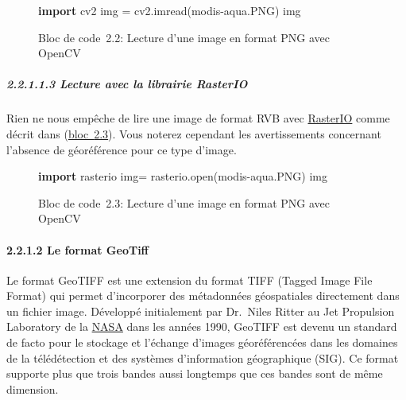 \documentclass[
]{article}
\newenvironment{Shaded}{}{}
\newcommand{\BuiltInTok}[1]{\textcolor[rgb]{0.00,0.50,0.00}{#1}}
\newcommand{\ImportTok}[1]{\textcolor[rgb]{0.00,0.50,0.00}{\textbf{#1}}}
\newcommand{\NormalTok}[1]{#1}
\newcommand{\OperatorTok}[1]{\textcolor[rgb]{0.40,0.40,0.40}{#1}}
\newcommand{\StringTok}[1]{\textcolor[rgb]{0.25,0.44,0.63}{#1}}
\begin{document}
\label{3c3aaa95}
\label{lst-lecture-opencv-PNG}
\begin{figure}
\centering
{}\label{lst-lecture-opencv-PNG}
\begin{Shaded}
\begin{Highlighting}[]
\ImportTok{import}\NormalTok{ cv2}
\NormalTok{img }\OperatorTok{=}\NormalTok{ cv2.imread(}\StringTok{\textquotesingle{}modis{-}aqua.PNG\textquotesingle{}}\NormalTok{)}
\NormalTok{img}
\end{Highlighting}
\end{Shaded}
\caption{Bloc de code~2.2: Lecture d'une image en format PNG avec
OpenCV}
\end{figure}

\subparagraph{\texorpdfstring{{2.2.1.1.3} Lecture avec la librairie
RasterIO}{2.2.1.1.3 Lecture avec la librairie RasterIO}}\label{lecture-avec-la-librairie-rasterio}

Rien ne nous empêche de lire une image de format RVB avec
\href{https://rasterio.readthedocs.io/en/stable/}{RasterIO} comme décrit
dans (\hyperref[lst-lecturerasterioPNG]{bloc~{2.3}}). Vous noterez
cependant les avertissements concernant l'absence de géoréférence pour
ce type d'image.

\label{d7c5205a}
\label{lst-lecturerasterioPNG}
\begin{figure}
\centering
{}\label{lst-lecturerasterioPNG}
\begin{Shaded}
\begin{Highlighting}[]
\ImportTok{import}\NormalTok{ rasterio}
\NormalTok{img}\OperatorTok{=}\NormalTok{ rasterio.}\BuiltInTok{open}\NormalTok{(}\StringTok{\textquotesingle{}modis{-}aqua.PNG\textquotesingle{}}\NormalTok{)}
\NormalTok{img}
\end{Highlighting}
\end{Shaded}
\caption{Bloc de code~2.3: Lecture d'une image en format PNG avec
OpenCV}
\end{figure}

\paragraph{\texorpdfstring{{2.2.1.2} Le format
GeoTiff}{2.2.1.2 Le format GeoTiff}}\label{le-format-geotiff}

Le format GeoTIFF est une extension du format TIFF (Tagged Image File
Format) qui permet d'incorporer des métadonnées géospatiales directement
dans un fichier image. Développé initialement par Dr.~Niles Ritter au
Jet Propulsion Laboratory de la
\href{https://www.earthdata.nasa.gov/esdis/esco/standards-and-practices/geotiff}{NASA}
dans les années 1990, GeoTIFF est devenu un standard de facto pour le
stockage et l'échange d'images géoréférencées dans les domaines de la
télédétection et des systèmes d'information géographique (SIG). Ce
format supporte plus que trois bandes aussi longtemps que ces bandes
sont de même dimension.
\end{document}
